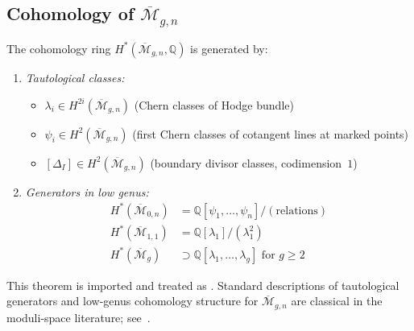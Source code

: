 \subsection{\texorpdfstring{Cohomology of $\overline{\mathcal{M}}_{g,n}$}{Cohomology of M-g,n}}

\begin{theorem}
\label{thm:mmm-classes}
The cohomology ring $H^*(\overline{\mathcal{M}}_{g,n}, \mathbb{Q})$ is generated by:
\begin{enumerate}
\item \emph{Tautological classes:}
\begin{itemize}
\item $\lambda_i \in H^{2i}(\overline{\mathcal{M}}_{g,n})$ (Chern classes of Hodge bundle)
\item $\psi_i \in H^2(\overline{\mathcal{M}}_{g,n})$ (first Chern classes of cotangent lines at marked points)
\item $[\Delta_I] \in H^{2}(\overline{\mathcal{M}}_{g,n})$ (boundary divisor classes, codimension~$1$)
\end{itemize}

\item \emph{Generators in low genus:}
\begin{align}
H^*(\overline{\mathcal{M}}_{0,n}) &= \mathbb{Q}[\psi_1, \ldots, \psi_n] / (\text{relations})\\
H^*(\overline{\mathcal{M}}_{1,1}) &= \mathbb{Q}[\lambda_1] / (\lambda_1^2)\\
H^*(\overline{\mathcal{M}}_g) &\supset \mathbb{Q}[\lambda_1, \ldots, \lambda_g] \text{ for } g \geq 2
\end{align}
\end{enumerate}
\end{theorem}

\begin{remark}
This theorem is imported and treated as \ClaimStatusProvedElsewhere. Standard
descriptions of tautological generators and low-genus cohomology structure for
$\overline{\mathcal{M}}_{g,n}$ are classical in the moduli-space literature;
see~\cite{Mumford83}.
\end{remark}

